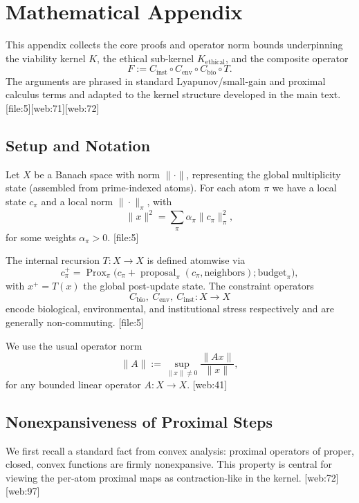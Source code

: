 \documentclass[11pt]{article}
\begin{document}
\appendix
\section{Mathematical Appendix}
\label{app:math}

This appendix collects the core proofs and operator norm bounds underpinning the viability kernel \(K\), the ethical sub-kernel \(K_{\text{ethical}}\), and the composite operator
\[
  F := C_{\text{inst}} \circ C_{\text{env}} \circ C_{\text{bio}} \circ T.
\]
The arguments are phrased in standard Lyapunov/small-gain and proximal calculus terms and adapted to the kernel structure developed in the main text. [file:5][web:71][web:72]

\subsection{Setup and Notation}

Let \(X\) be a Banach space with norm \(\|\cdot\|\), representing the global multiplicity state (assembled from prime-indexed atoms). For each atom \(\pi\) we have a local state \(c_\pi\) and a local norm \(\|\cdot\|_\pi\), with
\[
  \|x\|^2 = \sum_{\pi} \alpha_\pi \|c_\pi\|_\pi^2,
\]
for some weights \(\alpha_\pi>0\). [file:5]

The internal recursion \(T:X\to X\) is defined atomwise via
\begin{equation}
  c^{+}_\pi = \operatorname{Prox}_\pi\bigl(c_\pi + \operatorname{proposal}_\pi(c_\pi,\text{neighbors}); \text{budget}_\pi\bigr),
  \label{eq:app-prox-update}
\end{equation}
with \(x^+ = T(x)\) the global post-update state. The constraint operators
\[
  C_{\text{bio}},\ C_{\text{env}},\ C_{\text{inst}} : X \to X
\]
encode biological, environmental, and institutional stress respectively and are generally non-commuting. [file:5]

We use the usual operator norm
\[
  \|A\| := \sup_{\|x\|\neq 0} \frac{\|A x\|}{\|x\|},
\]
for any bounded linear operator \(A:X\to X\). [web:41]

\subsection{Nonexpansiveness of Proximal Steps}

We first recall a standard fact from convex analysis: proximal operators of proper, closed, convex functions are firmly nonexpansive. This property is central for viewing the per-atom proximal maps as contraction-like in the kernel. [web:72][web:97]
\end{document}
